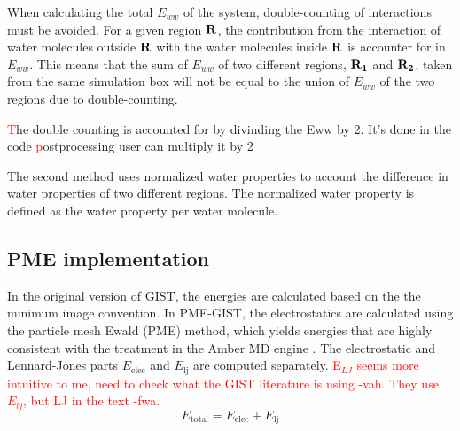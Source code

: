 \documentclass[9pt,tutorial]{livecoms}
\newcommand{\todo}{\textcolor{red}}
\begin{document}


When calculating the total $E_{ww}$ of the system, double-counting of interactions must be avoided. For a given region $\bold{R}$, the contribution
from the interaction of  water molecules outside $\bold{R}$ with the water molecules inside $\bold{R}$ is accounter for in $E_{ww}$. This means that
the sum of $E_{ww}$ of two different regions, $\bold{R_1}$  and $\bold{R_2}$, taken from the same simulation box will not be equal 
to the union of $E_{ww}$ of the two regions due to double-counting. 

\todo The double counting is accounted for by divinding the Eww by 2. It's done in the code
\todo postprocessing user can multiply it by 2

The second method uses normalized water properties to account the difference in water properties of two different regions. 
The normalized water property is defined as the water property per water molecule. 


\subsection{PME implementation}

In the original version of GIST, the energies are calculated based on the the minimum image convention.
In PME-GIST, the electrostatics are calculated using the particle mesh Ewald (PME) method, which yields energies that are highly consistent with the treatment in the Amber MD engine \cite{Chen2021}.
The electrostatic and Lennard-Jones parts $E_\text{elec}$ and $E_\text{lj}$ are computed separately.
\todo{E$_{LJ}$ seems more intuitive to me, need to check what the GIST literature is using -vah. They use $E_{lj}$, but LJ in the text -fwa.}
\begin{equation}
	E_\text{total} = E_\text{elec} + E_\text{lj}
\end{equation}
\end{document}
